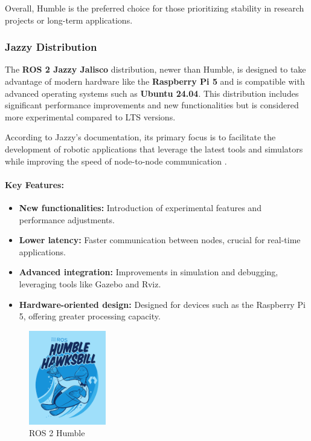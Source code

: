 Overall, Humble is the preferred choice for those prioritizing stability in research projects or long-term applications.

\subsubsection{Jazzy Distribution}

The \textbf{ROS 2 Jazzy Jalisco} distribution, newer than Humble, is designed to take advantage of modern hardware like the \textbf{Raspberry Pi 5} and is compatible with advanced operating systems such as \textbf{Ubuntu 24.04}. This distribution includes significant performance improvements and new functionalities but is considered more experimental compared to LTS versions.

According to Jazzy's documentation, its primary focus is to facilitate the development of robotic applications that leverage the latest tools and simulators while improving the speed of node-to-node communication \cite{jazzy_documentation}.

\paragraph{Key Features:}
\begin{itemize}
    \item \textbf{New functionalities:} Introduction of experimental features and performance adjustments.
    \item \textbf{Lower latency:} Faster communication between nodes, crucial for real-time applications.
    \item \textbf{Advanced integration:} Improvements in simulation and debugging, leveraging tools like Gazebo and Rviz.
    \item \textbf{Hardware-oriented design:} Designed for devices such as the Raspberry Pi 5, offering greater processing capacity.
\end{itemize}

\begin{figure}[h!]
    \centering
    \includegraphics[width=0.3\textwidth]{pictures/humble_logo.png}
    \caption{ROS 2 Humble}
    \label{fig:imagen1}
\end{figure}


